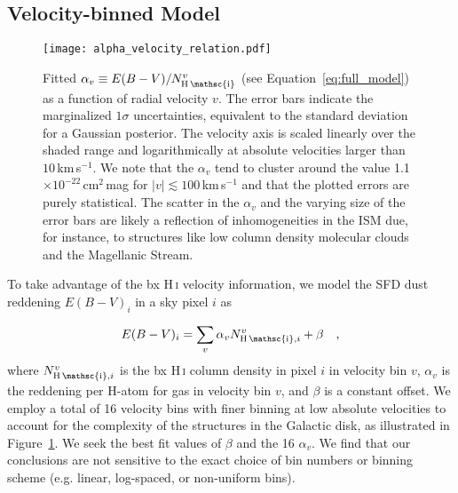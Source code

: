 \documentclass[iop,apj]{emulateapj}
\makeatletter
\def\testbx{bx}%
\DeclareRobustCommand{\ion}[2]{%
\relax\ifmmode
\ifx\testbx\f@series
{\mathbf{#1\,\mathsc{#2}}}\else
{\mathrm{#1\,\mathsc{#2}}}\fi
\else\textup{#1\,{\mdseries\textsc{#2}}}%
\fi}
\makeatother
\begin{document}
\subsection{Velocity-binned Model}
\label{subsec:model}
\begin{figure}[tp]
	\texttt{[image: alpha\_velocity\_relation.pdf]}
	\caption{Fitted $\alpha_v \equiv E(B-V)/N^v_{\ion{H}{i}}$  (see Equation~\ref{eq:full_model}) as a function of radial velocity $v$. The error bars indicate the marginalized $1\sigma$ uncertainties, equivalent to the standard deviation for a Gaussian posterior. The velocity axis is scaled linearly over the shaded range and logarithmically at absolute velocities larger than $10$\,km\,s$^{-1}$. We note that the $\alpha_v$ tend to cluster around the value 1.1$\times10^{-22}$\,cm$^2$\,mag for $|v| \lesssim 100$\,km\,s$^{-1}$ and that the plotted errors are purely statistical. The scatter in the $\alpha_v$ and the varying size of the error bars are likely a reflection of inhomogeneities in the ISM due, for instance, to structures like low column density molecular clouds and the Magellanic Stream.}
	\label{fig:alpha_velocity_relation}
\end{figure}

To take advantage of the \ion{H}{i} velocity information, we model the SFD dust reddening $E(B-V)_i$ in a sky pixel $i$ as

\begin{equation}
	E(B-V)_i = \sum_v \alpha_{v} N^v_{\ion{H}{i},i} + \beta
	\label{eq:full_model}
~~~,
\end{equation}
where $N^v_{\ion{H}{i},i}$ is the \ion{H}{i} column density in pixel $i$ in velocity bin $v$, $\alpha_v$ is the reddening per H-atom for gas in velocity bin $v$, and $\beta$ is a constant offset. We employ a total of 16 velocity bins with finer binning at low absolute velocities to account for the complexity of the structures in the Galactic disk, as illustrated in Figure~\ref{fig:alpha_velocity_relation}. We seek the best fit values of $\beta$ and the 16 $\alpha_v$. We find that our conclusions are not sensitive to the exact choice of bin numbers or binning scheme (e.g. linear, log-spaced, or non-uniform bins).
\end{document}
